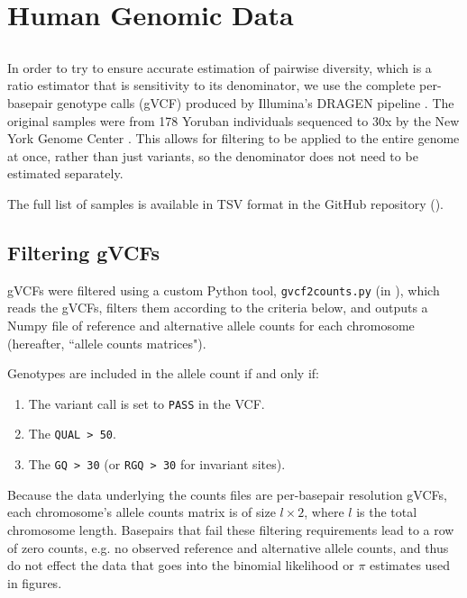 \documentclass[11pt]{article}
\begin{document}
\section{Human Genomic Data}

\subsection{}

In order to try to ensure accurate estimation of pairwise diversity, which is a
ratio estimator that is sensitivity to its denominator, we use the complete
per-basepair genotype calls (gVCF) produced by Illumina's DRAGEN pipeline
\parencite{Illumina_Inc2020-dk}. The original samples were from 178 Yoruban
individuals sequenced to 30x by the New York Genome Center
\parencite{Byrska-Bishop2022-tn}. This allows for filtering to be applied to
the entire genome at once, rather than just variants, so the denominator does
not need to be estimated separately.

The full list of samples is available in TSV format in the GitHub repository
().

\subsection{Filtering gVCFs}

gVCFs were filtered using a custom Python tool, \texttt{gvcf2counts.py} (in
), which reads the gVCFs, filters them according to
the criteria below, and outputs a Numpy  file of reference and
alternative allele counts for each chromosome (hereafter, ``allele counts
matrices").

Genotypes are included in the allele count if and only if:

\begin{enumerate}
  \item The variant call is set to \texttt{PASS} in the VCF.
  \item The \texttt{QUAL > 50}.
  \item The \texttt{GQ > 30} (or \texttt{RGQ > 30} for invariant sites).
\end{enumerate}

Because the data underlying the counts files are per-basepair resolution gVCFs,
each chromosome's allele counts matrix is of size $l \times 2$, where $l$ is
the total chromosome length. Basepairs that fail these filtering requirements
lead to a row of zero counts, e.g. no observed reference and alternative allele
counts, and thus do not effect the data that goes into the binomial likelihood
or $\pi$ estimates used in figures.
\end{document}

